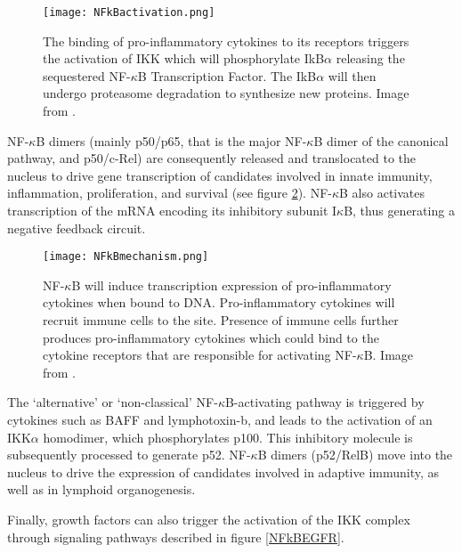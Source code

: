 \documentclass[12pt,a4paper]{report}
\begin{document}
\begin{figure}
\texttt{[image: NFkBactivation.png]}
\caption{The binding of pro-inflammatory cytokines to its receptors triggers the activation of IKK which will phosphorylate IkB$\alpha$ releasing the sequestered NF-$\kappa$B Transcription Factor. The IkB$\alpha$ will then undergo proteasome degradation to synthesize new proteins. Image from \cite{Project}.}
\label{NFkBactivation}
\end{figure}
\newpage
NF-$\kappa$B dimers (mainly p50/p65, that is the major NF-$\kappa$B dimer of the canonical pathway, and p50/c-Rel) are consequently released and translocated to the nucleus to drive gene transcription of candidates involved in innate immunity, inflammation, proliferation, and survival (see figure \ref{NFkBmechanism}). 
\newline    
NF-$\kappa$B also activates transcription of the mRNA encoding its inhibitory subunit I$\kappa$B, thus generating a negative feedback circuit.

\begin{figure}[ht]
\texttt{[image: NFkBmechanism.png]}
\caption{NF-$\kappa$B will induce transcription expression of pro-inflammatory cytokines when bound to DNA. Pro-inflammatory cytokines will recruit immune cells to the site. Presence of immune cells further produces pro-inflammatory cytokines which could bind to the cytokine receptors that are responsible for activating NF-$\kappa$B. Image from \cite{Project}.}
\label{NFkBmechanism}
\end{figure}
\newpage
The ‘alternative’ or ‘non-classical’ NF-$\kappa$B-activating pathway is triggered by cytokines such as BAFF and lymphotoxin-b, and leads to the activation of an IKK$\alpha$ homodimer, which phosphorylates p100. This inhibitory molecule is subsequently processed to generate p52. NF-$\kappa$B dimers (p52/RelB) move into the nucleus to drive the expression of candidates involved in adaptive immunity, as well as in lymphoid organogenesis.


Finally, growth factors can also trigger the activation of the IKK complex through signaling pathways described in figure \ref{NFkBEGFR}.
\end{document}
